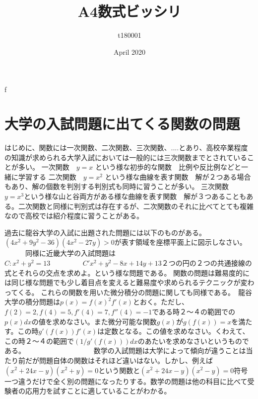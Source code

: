 f\documentclass{article}
\title{A4数式ビッシリ}
\author{t180001 }
\date{April 2020}
\begin{document}
\maketitle

\section{大学の入試問題に出てくる関数の問題}
はじめに、関数には一次関数、二次関数、三次関数、....とあり、高校卒業程度の知識が求められる大学入試においては一般的には三次関数までとされていることが多い。
一次関数　$y=x$ という様な初歩的な関数　比例や反比例などと一緒に学習する
二次関数　$y=x^2$  という様な曲線を表す関数　解が２つある場合もあり、解の個数を判別する判別式も同時に習うことが多い。
三次関数　$y=x^3$という様な山と谷両方がある様な曲線を表す関数　解が３つあることもある。二次関数と同様に判別式は存在するが、二次関数のそれに比べてとても複雑なので高校では紹介程度に習うことがある。　

過去に龍谷大学の入試に出題された問題には以下のものがある。　　　　　$(4x^2+9y^2-36)(4x^2-27y)>0$が表す領域を座標平面上に図示しなさい。
　　　同様に近畿大学の入試問題は　　　　　　　　　　　　　　　　　　　　　　$C:x^2+y^2=13$   　　　　  $   C'x^2+y^2-8x+14y+13$２つの円の２つの共通接線の式とそれらの交点を求めよ。という様な問題である。
   関数の問題は難易度的には同じ様な問題でも少し着目点を変えると難易度や求められるテクニックが変わってくる。
   これらの関数を用いた微分積分の問題に関しても同様である。　龍谷大学の積分問題は$p(x)={f(x)}^2f'(x)$とおく。ただし、$f(2)=2,f(4)=5,f'(4)=7,f''(4)=-1$である時２〜４の範囲での$p(x)dx$の値を求めなさい。また微分可能な関数$g(x)$が$g(f(x))=x$を満たす。この時$g'(f(x))f'(x)$は定数となる。この値を求めなさい。くわえて、この時２〜４の範囲で$(1/g'(f(x)))dx$のあたいを求めなさいというものである。　　　　　　　　　　
数学の入試問題は大学によって傾向が違うことは当たり前だが問題自体の関数はそれほど違いはない。しかし、例えば$(x^2+24x-y)(x^2+y)=0$という関数と$(x^2+24x-y)(x^2-y)=0$符号一つ違うだけで全く別の問題になったりする。数学の問題は他の科目に比べて受験者の応用力を試すことに適していることがわかる。 
 
\end{document}

